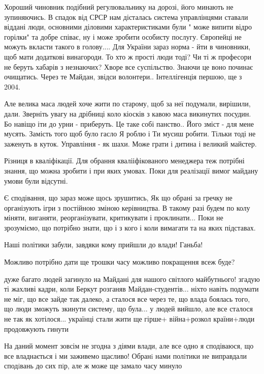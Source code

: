 \begin{itemize}
Хороший чиновник подібний регулювальнику на дорозі, його
минають не зупиняючись. В спадок від СРСР нам дісталась система управлінцями
ставали віддані люди, основними діловими характеристиками були " може випити
відро горілки" та добре співає, ну і може зробити особисту послугу. Європейці
не можуть вкласти такого в голову.... Для України зараз норма - йти в чиновники,
щоб мати додаткові винагороди. То хто ж прості люди тоді? Чи ті ж професори не
беруть хабарів з незнаючих? Хворе все суспільство. Знаючи це воно починає
очищатись. Через те Майдан, звідси волонтери.. Інтеллігенція першою, ще з 2004.

Але велика маса людей хоче жити по старому, щоб за неї подумали, вирішили,
дали. Зверніть увагу на дрібниці коло кіосків з кавою маса викинутих посудин.
Бо навіщо іти до урни - приберуть. Це таке собі панство.. Його зміст - для мене
мусять. Замість того щоб було гасло Я роблю і Ти мусиш робити. Тільки тоді не
заженуть в куток. Управління - як шахи. Може грати і дитина і великий майстер.

Різниця в кваліфікації. Для обрання квалііфікованого менеджера теж потрібні
знання, що можна зробити і при яких умовах. Поки для реалізації вимог майдану
умови були відсутні. 

Є сподівання, що зараз може щось зрушитись, Як що обрані за
гречку не організують ігри з постійною зміною керівництва. В такому разі будем
по колу міняти, виганяти, реорганізувати, критикувати і проклинати... Поки не
зрозуміємо, що потрібно знати, що і з кого і коли вимагати та на яких
підставах.

Наші політики забули, завдяки кому прийшли до влади! Ганьба!

Можливо потрібно дати ще трошки часу можливо покращення всеж буде?


дуже багато людей загинуло на Майдані для нашого світлого майбутнього! згадую
ті жахливі кадри, коли Беркут розганяв Майдан-студентів... ніхто навіть подумати
не міг, що все зайде так далеко, а сталося все через те, що влада боялась того, що
люди зможуть зкинути систему, що була... у людей вийшло, але все сталося не так
як хотілося... українці стали жити ще гірше+ війна+розкол країни+люди
продовжують гинути


На даний момент зовсім не згодна з діями влади, але все одно я сподіваюся, що все
владнається і ми заживемо щасливо! Обранi нами полiтики не виправдали сподiвань
до сих пiр, але ж може ще замало часу минуло


\end{itemize}
